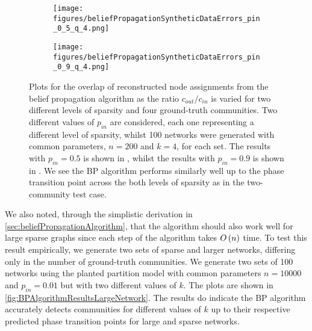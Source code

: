 \begin{figure}
\centering
	\begin{subfigure}{.5\textwidth}
		\centering
		\texttt{[image: figures/beliefPropagationSyntheticDataErrors\_pin\_0\_5\_q\_4.png]}
		\caption{}
		\label{fig:BPAlgorithmResults4Communities_pin_0_5}
	\end{subfigure}%
	\begin{subfigure}{.5\textwidth}
		\centering
		\texttt{[image: figures/beliefPropagationSyntheticDataErrors\_pin\_0\_9\_q\_4.png]}
		\caption{}
		\label{fig:BPAlgorithmResults4Communities_pin_0_9}
	\end{subfigure}
	\caption[Plot of overlap for belief propagation algorithm on small-sized networks with three different levels of sparsity and four ground-truth communities.]{\label{fig:BPAlgorithmResults4Communities} Plots for the overlap of reconstructed node assignments from the belief propagation algorithm as the ratio $c_{out}/c_{in}$ is varied for two different levels of sparsity and four ground-truth communities. Two different values of $p_{in}$ are considered, each one representing a different level of sparsity, whilst 100 networks were generated with common parameters, $n = 200$ and $k = 4$, for each set. The results with $p_{in} = 0.5$ is shown in , whilst the results with $p_{in} = 0.9$ is shown in . We see the BP algorithm performs similarly well up to the phase transition point across the both levels of sparsity as in the two-community test case.}
\end{figure}

We also noted, through the simplistic derivation in \cref{sec:beliefPropagationAlgorithm}, that the algorithm should also work well for large sparse graphs since each step of the algorithm takes $O\left(n\right)$ time.
To test this result empirically, we generate two sets of sparse and larger networks, differing only in the number of ground-truth communities.
We generate two sets of 100 networks using the planted partition model with common parameters $n = 10000$ and $p_{in} = 0.01$ but with two different values of $k$.
The plots are shown in \cref{fig:BPAlgorithmResultsLargeNetwork}.
The results do indicate the BP algorithm accurately detects communities for different values of $k$ up to their respective predicted phase transition points for large and sparse networks.

